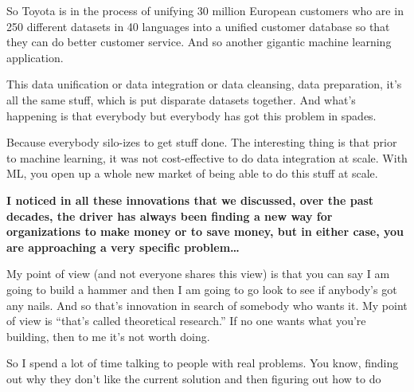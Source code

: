 \documentclass[a4paper,12pt,notitlepage,twoside,openright]{article}
\begin{document}
So Toyota is in the process of unifying 30 million European customers
who are in 250 different datasets in 40 languages into a unified
customer database so that they can do better customer service. And so
another gigantic machine learning application.

This data unification or data integration or data cleansing, data
preparation, it's all the same stuff, which is put disparate datasets
together. And what's happening is that everybody but everybody has got
this problem in spades.

Because everybody silo-izes to get stuff done. The interesting thing is
that prior to machine learning, it was not cost-effective to do data
integration at scale. With ML, you open up a whole new market of being
able to do this stuff at scale.

\textbf{I noticed in all these innovations that we discussed, over the
past decades, the driver has always been finding a new way for
organizations to make money or to save money, but in either case, you
are approaching a very specific problem\ldots{}}

My point of view (and not everyone shares this view) is that you can say
I am going to build a hammer and then I am going to go look to see if
anybody's got any nails. And so that's innovation in search of somebody
who wants it. My point of view is ``that's called theoretical
research.'' If no one wants what you're building, then to me it's not
worth doing.

So I spend a lot of time talking to people with real problems. You know,
finding out why they don't like the current solution and then figuring
out how to do
\end{document}
